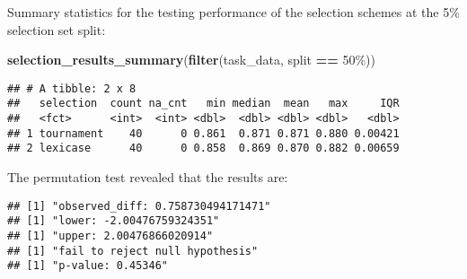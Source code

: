 \documentclass[
]{book}
\newenvironment{Shaded}{\begin{snugshade}}{\end{snugshade}}
\newcommand{\AttributeTok}[1]{\textcolor[rgb]{0.13,0.29,0.53}{#1}}
\newcommand{\DecValTok}[1]{\textcolor[rgb]{0.00,0.00,0.81}{#1}}
\newcommand{\FunctionTok}[1]{\textcolor[rgb]{0.13,0.29,0.53}{\textbf{#1}}}
\newcommand{\NormalTok}[1]{#1}
\newcommand{\OtherTok}[1]{\textcolor[rgb]{0.56,0.35,0.01}{#1}}
\newcommand{\SpecialCharTok}[1]{\textcolor[rgb]{0.81,0.36,0.00}{\textbf{#1}}}
\newcommand{\StringTok}[1]{\textcolor[rgb]{0.31,0.60,0.02}{#1}}
\begin{document}
Summary statistics for the testing performance of the selection schemes at the 5\% selection set split:

\begin{Shaded}
\begin{Highlighting}[]
\FunctionTok{selection\_results\_summary}\NormalTok{(}\FunctionTok{filter}\NormalTok{(task\_data, split }\SpecialCharTok{==} \StringTok{\textquotesingle{}50\%\textquotesingle{}}\NormalTok{))}
\end{Highlighting}
\end{Shaded}

\begin{verbatim}
## # A tibble: 2 x 8
##   selection  count na_cnt   min median  mean   max     IQR
##   <fct>      <int>  <int> <dbl>  <dbl> <dbl> <dbl>   <dbl>
## 1 tournament    40      0 0.861  0.871 0.871 0.880 0.00421
## 2 lexicase      40      0 0.858  0.869 0.870 0.882 0.00659
\end{verbatim}

The permutation test revealed that the results are:

\begin{Shaded}
\end{Shaded}

\begin{verbatim}
## [1] "observed_diff: 0.758730494171471"
## [1] "lower: -2.00476759324351"
## [1] "upper: 2.00476866020914"
## [1] "fail to reject null hypothesis"
## [1] "p-value: 0.45346"
\end{verbatim}
\end{document}
